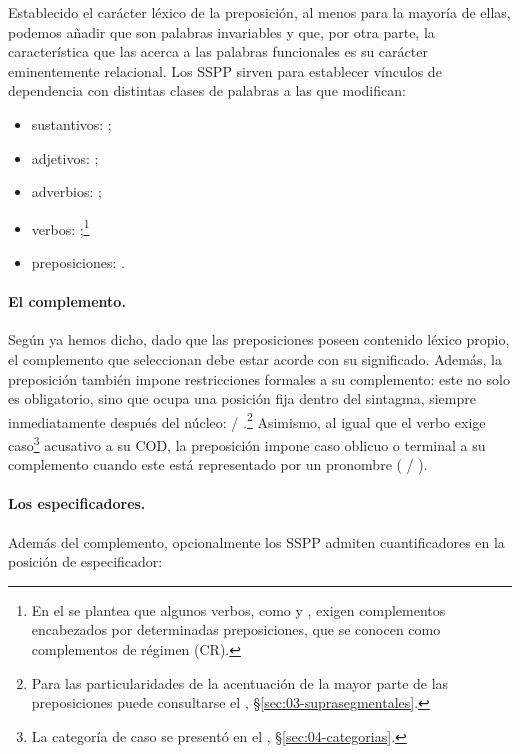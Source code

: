 Establecido el carácter léxico de la preposición, al menos para la mayoría de
ellas, podemos añadir que son palabras invariables y que, por otra parte, la
característica que las acerca a las palabras funcionales es su carácter
eminentemente relacional. Los SSPP sirven para establecer vínculos de
dependencia con distintas clases de palabras a las que modifican:

\begin{itemize}
  \item sustantivos: ;
  \item adjetivos: ;
  \item adverbios: ;
  \item verbos: ;\footnote{En el  se plantea que
        algunos verbos, como  y , exigen
        complementos encabezados por determinadas preposiciones, que se conocen
        como complementos de régimen (CR).}
  \item preposiciones: .
\end{itemize}

\paragraph{El complemento.} Según ya hemos dicho, dado que las preposiciones
poseen contenido léxico propio, el complemento que seleccionan debe estar acorde
con su significado. Además, la preposición también impone restricciones
formales a su complemento: este no solo es obligatorio, sino que ocupa una
posición fija dentro del sintagma, siempre inmediatamente después del núcleo:
 / .\footnote{Para las
particularidades de la acentuación de la mayor parte de las preposiciones puede
consultarse el , §\ref{sec:03-suprasegmentales}.} Asimismo, al igual
que el verbo exige caso\footnote{La categoría de caso se presentó en el
, §\ref{sec:04-categorias}.} acusativo a su COD, la preposición impone
caso oblicuo o terminal a su complemento cuando este está representado por un
pronombre ( / ).

\paragraph{Los especificadores.} Además del complemento, opcionalmente los SSPP
admiten cuantificadores en la posición de especificador:


